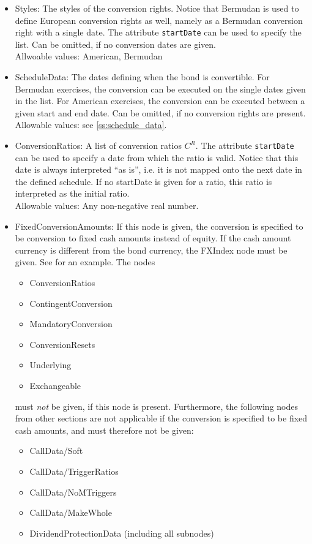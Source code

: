 \begin{itemize}

\item Styles: The styles of the conversion rights. Notice that Bermudan is used to define European conversion rights as
  well, namely as a Bermudan conversion right with a single date. The attribute \verb+startDate+ can be used to
  specify the list. Can be omitted, if no conversion dates are given.\\
  Allwoable values: American, Bermudan

\item ScheduleData: The dates defining when the bond is convertible. For Bermudan exercises, the conversion can be
  executed on the single dates given in the list. For American exercises, the conversion can be executed between a given
  start and end date. Can be omitted, if no conversion rights are present.\\
  Allowable values: see \ref{ss:schedule_data}.

\item ConversionRatios: A list of conversion ratios $C^R$. The attribute \verb+startDate+ can be used to specify a date
  from which the ratio is valid. Notice that this date is always interpreted ``as is'', i.e. it is not mapped onto the
  next date in the defined schedule. If no startDate is given for a ratio, this ratio is interpreted as the initial
  ratio. \\
  Allowable values: Any non-negative real number.

\item FixedConversionAmounts: If this node is given, the conversion is specified to be conversion to fixed cash amounts
  instead of equity. If the cash amount currency is different from the bond currency, the FXIndex node must be
  given. See \label{lst:convertiblebonddata_conversion_6} for an example. The nodes
\begin{itemize}
  \item ConversionRatios
  \item ContingentConversion
  \item MandatoryConversion
  \item ConversionResets
  \item Underlying
  \item Exchangeable
\end{itemize}
must {\em not} be given, if this node is present. Furthermore, the following nodes from other sections are not
applicable if the conversion is specified to be fixed cash amounts, and must therefore not be given:
\begin{itemize}
\item CallData/Soft
\item CallData/TriggerRatios
\item CallData/NoMTriggers
\item CallData/MakeWhole
\item DividendProtectionData (including all subnodes)
\end{itemize}


\end{itemize}

